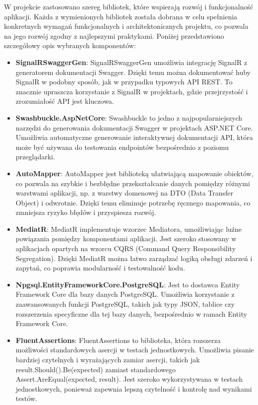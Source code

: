 \documentclass[12pt,a4paper]{article}
\begin{document}
W projekcie zastosowano szereg bibliotek, które wspierają rozwój i funkcjonalność aplikacji. Każda z wymienionych bibliotek została dobrana w celu spełnienia konkretnych wymagań funkcjonalnych i architektonicznych projektu, co pozwala na jego rozwój zgodny z najlepszymi praktykami. Poniżej przedstawiono szczegółowy opis wybranych komponentów:
\begin{itemize}
    \item \textbf{SignalRSwaggerGen}: SignalRSwaggerGen umożliwia integrację SignalR z generatorem dokumentacji Swagger. Dzięki temu można dokumentować huby SignalR w podobny sposób, jak w przypadku typowych API REST. To znacznie upraszcza korzystanie z SignalR w projektach, gdzie przejrzystość i zrozumiałość API jest kluczowa.
    \item \textbf{Swashbuckle.AspNetCore}: Swashbuckle to jedno z najpopularniejszych narzędzi do generowania dokumentacji Swagger w projektach ASP.NET Core. Umożliwia automatyczne generowanie interaktywnej dokumentacji API, która może być używana do testowania endpointów bezpośrednio z poziomu przeglądarki.
    \item \textbf{AutoMapper}: AutoMapper jest biblioteką ułatwiającą mapowanie obiektów, co pozwala na szybkie i bezbłędne przekształcanie danych pomiędzy różnymi warstwami aplikacji, np. z warstwy domenowej na DTO (Data Transfer Object) i odwrotnie. Dzięki temu eliminuje potrzebę ręcznego mapowania, co zmniejsza ryzyko błędów i przyspiesza rozwój.
    \item \textbf{MediatR}: MediatR implementuje wzorzec Mediatora, umożliwiając luźne powiązania pomiędzy komponentami aplikacji. Jest szeroko stosowany w aplikacjach opartych na wzorcu CQRS (Command Query Responsibility Segregation). Dzięki MediatR można łatwo zarządzać logiką obsługi zdarzeń i zapytań, co poprawia modularność i testowalność kodu.
    \item \textbf{Npgsql.EntityFrameworkCore.PostgreSQL}: Jest to dostawca Entity Framework Core dla bazy danych PostgreSQL. Umożliwia korzystanie z zaawansowanych funkcji PostgreSQL, takich jak typy JSON, tablice czy rozszerzenia specyficzne dla tej bazy danych, bezpośrednio w ramach Entity Framework Core.
    \item \textbf{FluentAssertions}: FluentAssertions to biblioteka, która rozszerza możliwości standardowych asercji w testach jednostkowych. Umożliwia pisanie bardziej czytelnych i wyrażających zamiar asercji, takich jak result.Should().Be(expected) zamiast standardowego Assert.AreEqual(expected, result). Jest szeroko wykorzystywana w testach jednostkowych, ponieważ zapewnia lepszą czytelność i kontrolę nad wynikami testów.


\end{itemize}
\end{document}
